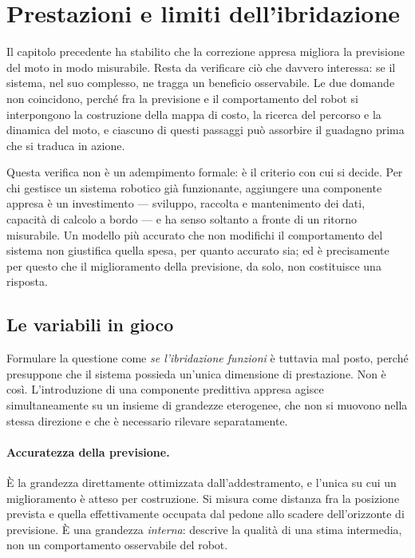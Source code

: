 
\section{Prestazioni e limiti dell'ibridazione}

Il capitolo precedente ha stabilito che la correzione appresa migliora la previsione del
moto in modo misurabile. Resta da verificare ciò che davvero interessa: se il sistema, nel
suo complesso, ne tragga un beneficio osservabile. Le due domande non coincidono, perché
fra la previsione e il comportamento del robot si interpongono la costruzione della mappa
di costo, la ricerca del percorso e la dinamica del moto, e ciascuno di questi passaggi
può assorbire il guadagno prima che si traduca in azione.

Questa verifica non è un adempimento formale: è il criterio con cui si decide. Per chi
gestisce un sistema robotico già funzionante, aggiungere una componente appresa è un
investimento --- sviluppo, raccolta e mantenimento dei dati, capacità di calcolo a bordo
--- e ha senso soltanto a fronte di un ritorno misurabile. Un modello più accurato che non
modifichi il comportamento del sistema non giustifica quella spesa, per quanto accurato
sia; ed è precisamente per questo che il miglioramento della previsione, da solo, non
costituisce una risposta.


\subsection{Le variabili in gioco}

Formulare la questione come \emph{se l'ibridazione funzioni} è tuttavia mal posto, perché
presuppone che il sistema possieda un'unica dimensione di prestazione. Non è così.
L'introduzione di una componente predittiva appresa agisce simultaneamente su un insieme
di grandezze eterogenee, che non si muovono nella stessa direzione e che è necessario
rilevare separatamente.

\paragraph{Accuratezza della previsione.} È la grandezza direttamente ottimizzata
dall'addestramento, e l'unica su cui un miglioramento è atteso per costruzione. Si misura
come distanza fra la posizione prevista e quella effettivamente occupata dal pedone allo
scadere dell'orizzonte di previsione. È una grandezza \emph{interna}: descrive la qualità
di una stima intermedia, non un comportamento osservabile del robot.

